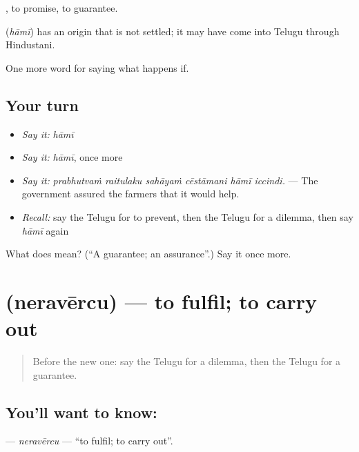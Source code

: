 , to promise, to guarantee.

\begin{cousinweb}
\textbf{} (\emph{hāmī}) has an origin that is not settled; it may have come into Telugu through Hindustani.
\end{cousinweb}

\begin{grammarlens}[title={What you've built}]
One more word for saying what happens if.
\end{grammarlens}

\subsection*{Your turn}
\begin{itemize}
\raggedright
  \item \emph{Say it:} \emph{hāmī}
  \item \emph{Say it:} \emph{hāmī}, once more
  \item \emph{Say it:} \emph{prabhutvaṁ raitulaku sahāyaṁ cēstāmani hāmī iccindi.} — The government assured the farmers that it would help.
  \item \emph{Recall:} say the Telugu for to prevent, then the Telugu for a dilemma, then say \emph{hāmī} again
\end{itemize}

\begin{tcolorbox}[breakable,colback=teal!4,colframe=teal!35!black,title={Before you move on}]
What does  mean? (\textquotedblleft{}A guarantee; an assurance\textquotedblright{}.) Say it once more.
\end{tcolorbox}
\section[\texorpdfstring{\te{నెరవేర్చు} (neravērcu)}{నెరవేర్చు (neravērcu)}]{ (neravērcu) — to fulfil; to carry out}

\label{lesson:TE-C422-neravercu}



\begin{quote}
Before the new one: say the Telugu for a dilemma, then the Telugu for a guarantee.
\end{quote}

\subsection*{You'll want to know: }
\textbf{} — \emph{neravērcu} — \textquotedblleft{}to fulfil; to carry out\textquotedblright{}.

